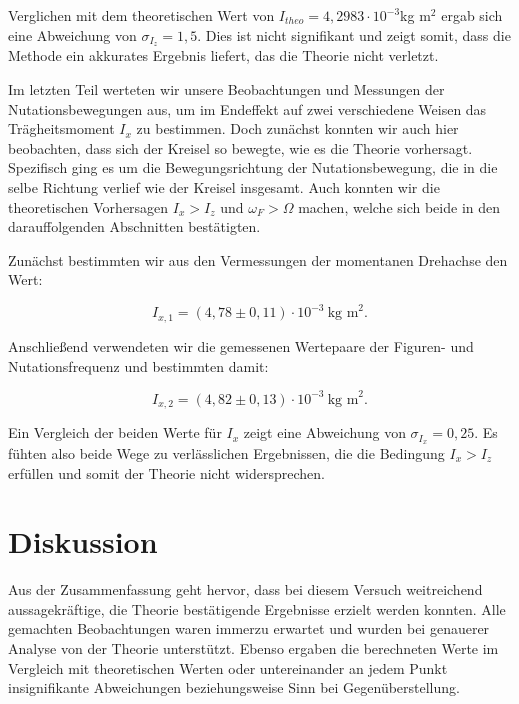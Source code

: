 \documentclass{article}
\begin{document}
Verglichen mit dem theoretischen Wert von $I_{theo} = 4,2983 \cdot 10^{-3}$kg m$^2$ ergab sich eine Abweichung von $\sigma_{I_z} = 1,5$. Dies ist nicht signifikant und zeigt somit, dass die Methode ein akkurates Ergebnis liefert, das die Theorie nicht verletzt. 

Im letzten Teil werteten wir unsere Beobachtungen und Messungen der Nutationsbewegungen aus, um im Endeffekt auf zwei verschiedene Weisen das Trägheitsmoment $I_x$ zu bestimmen. Doch zunächst konnten wir auch hier beobachten, dass sich der Kreisel so bewegte, wie es die Theorie vorhersagt. Spezifisch ging es um die Bewegungsrichtung der Nutationsbewegung, die in die selbe Richtung verlief wie der Kreisel insgesamt. Auch konnten wir die theoretischen Vorhersagen $I_x > I_z$ und $\omega_F > \Omega$ machen, welche sich beide in den darauffolgenden Abschnitten bestätigten.  

Zunächst bestimmten wir aus den Vermessungen der momentanen Drehachse den Wert:

\begin{equation}
    I_{x,1} = (4,78 \pm 0,11) \cdot 10^{-3} \ \text{kg m}^2.
\end{equation}

Anschließend verwendeten wir die gemessenen Wertepaare der Figuren- und Nutationsfrequenz und bestimmten damit:

\begin{equation}
    I_{x,2} = (4,82 \pm 0,13) \cdot 10^{-3} \ \text{kg m}^2.
\end{equation}

Ein Vergleich der beiden Werte für $I_x$ zeigt eine Abweichung von $\sigma_{I_x} = 0,25$. Es fühten also beide Wege zu verlässlichen Ergebnissen, die die Bedingung $I_x > I_z$ erfüllen und somit der Theorie nicht widersprechen.    

\newpage
\section{Diskussion}

Aus der Zusammenfassung geht hervor, dass bei diesem Versuch weitreichend aussagekräftige, die Theorie bestätigende Ergebnisse erzielt werden konnten. Alle gemachten Beobachtungen waren immerzu erwartet und wurden bei genauerer Analyse von der Theorie unterstützt. Ebenso ergaben die berechneten Werte im Vergleich mit theoretischen Werten oder untereinander an jedem Punkt insignifikante Abweichungen beziehungsweise Sinn bei Gegenüberstellung. 
\end{document}
